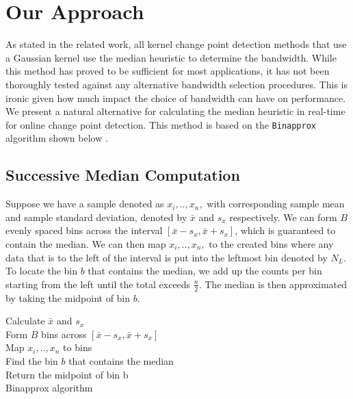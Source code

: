 
\section{Our Approach}
\label{our_approach}

As stated in the related work, all kernel change point detection methods that use a Gaussian kernel use the median heuristic to determine the bandwidth. While this method has proved to be sufficient for most applications, it has not been thoroughly tested against any alternative bandwidth selection procedures. This is ironic given how much impact the choice of bandwidth can have on performance. We present a natural alternative for calculating the median heuristic in real-time for online change point detection. This method is based on the \texttt{Binapprox} algorithm shown below \cite{tibshirani2008fast}. 

\subsection{Successive Median Computation}
Suppose we have a sample denoted as $x_i,..,x_n,$ with corresponding sample mean and sample standard deviation, denoted by $\bar{x}$ and $s_x$ respectively. We can form $B$ evenly spaced bins across the interval $[\bar{x} - s_x, \bar{x} + s_x]$, which is guaranteed to contain the median. We can then map $x_i,..,x_n,$ to the created bins where any data that is to the left of the interval is put into the leftmost bin denoted by $N_L$. To locate the bin $b$ that contains the median, we add up the counts per bin starting from the left until the total exceeds $\frac{n}{2}.$ The median is then approximated by taking the midpoint of bin $b$.

\begin{center}
\begin{algorithm}[H]
\SetAlgoLined
{}
Calculate $\bar{x}$ and $s_x$\\
Form $B$ bins across $[\bar{x} - s_x, \bar{x} + s_x]$\\
Map $x_i,..,x_n$ to bins\\
Find the bin $b$ that contains the median\\
Return the midpoint of bin b\\
 \caption{Binapprox algorithm}
\end{algorithm}
\end{center}


